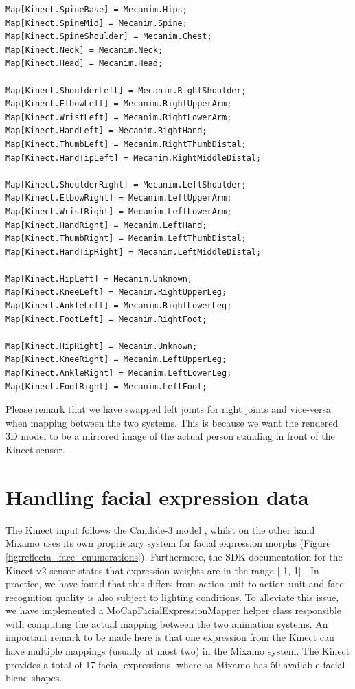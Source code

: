 \documentclass[a4paper, 12pt]{amsart}
\begin{document}
\begin{lstlisting}[basicstyle=\tiny]
Map[Kinect.SpineBase] = Mecanim.Hips;
Map[Kinect.SpineMid] = Mecanim.Spine;
Map[Kinect.SpineShoulder] = Mecanim.Chest;
Map[Kinect.Neck] = Mecanim.Neck;
Map[Kinect.Head] = Mecanim.Head;

Map[Kinect.ShoulderLeft] = Mecanim.RightShoulder;
Map[Kinect.ElbowLeft] = Mecanim.RightUpperArm;
Map[Kinect.WristLeft] = Mecanim.RightLowerArm;
Map[Kinect.HandLeft] = Mecanim.RightHand;
Map[Kinect.ThumbLeft] = Mecanim.RightThumbDistal;
Map[Kinect.HandTipLeft] = Mecanim.RightMiddleDistal;

Map[Kinect.ShoulderRight] = Mecanim.LeftShoulder;
Map[Kinect.ElbowRight] = Mecanim.LeftUpperArm;
Map[Kinect.WristRight] = Mecanim.LeftLowerArm;
Map[Kinect.HandRight] = Mecanim.LeftHand;
Map[Kinect.ThumbRight] = Mecanim.LeftThumbDistal;
Map[Kinect.HandTipRight] = Mecanim.LeftMiddleDistal;

Map[Kinect.HipLeft] = Mecanim.Unknown;
Map[Kinect.KneeLeft] = Mecanim.RightUpperLeg;
Map[Kinect.AnkleLeft] = Mecanim.RightLowerLeg;
Map[Kinect.FootLeft] = Mecanim.RightFoot;

Map[Kinect.HipRight] = Mecanim.Unknown;
Map[Kinect.KneeRight] = Mecanim.LeftUpperLeg;
Map[Kinect.AnkleRight] = Mecanim.LeftLowerLeg;
Map[Kinect.FootRight] = Mecanim.LeftFoot;
\end{lstlisting}

Please remark that we have swapped left joints for right joints and vice-versa when mapping between the two systems. This is because we want the rendered 3D model to be a mirrored image of the actual person standing in front of the Kinect sensor.

\clearpage

\section{Handling facial expression data}

The Kinect input follows the Candide-3 model \cite{bib_candide_3}, whilst on the other hand Mixamo uses its own proprietary system for facial expression morphs (Figure \ref{fig:reflecta_face_enumerations}). Furthermore, the SDK documentation for the Kinect v2 sensor states that expression weights are in the range [-1, 1] \cite{bib_microsoft_kinect_v2_sdk}. In practice, we have found that this differs from action unit to action unit and face recognition quality is also subject to lighting conditions. To alleviate this issue, we have implemented a MoCapFacialExpressionMapper helper class responsible with computing the actual mapping between the two animation systems. An important remark to be made here is that one expression from the Kinect can have multiple mappings (usually at most two) in the Mixamo system. The Kinect provides a total of 17 facial expressions, where as Mixamo has 50 available facial blend shapes.
\end{document}

